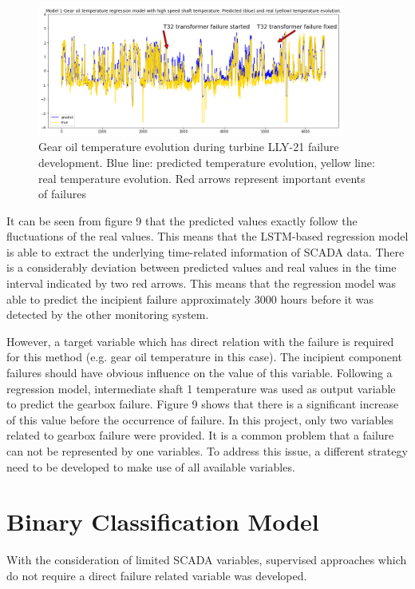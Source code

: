 \begin{figure}[]
\centering
\includegraphics[width=0.9\textwidth]{figures/regression.png}
\caption{Gear oil temperature evolution during turbine LLY-21 failure development. Blue line: predicted temperature evolution, yellow line: real temperature evolution. Red arrows represent important events of failures}
\label{fig:B-B1}
\end{figure}

It can be seen from figure 9 that the predicted values exactly follow the fluctuations of the real values. This means that the LSTM-based regression model is able to extract the underlying time-related information of SCADA data. There is a considerably deviation between predicted values and real values in the time interval indicated by two red arrows. This means that the regression model was able to predict the incipient failure approximately 3000 hours before it was detected by the other monitoring system.

However, a target variable which has direct relation with the failure is required for this method (e.g. gear oil temperature in this case). The incipient component failures should have obvious influence on the value of this variable. Following a regression model\cite{Sofia}, intermediate shaft 1 temperature was used as output variable to predict the gearbox failure. Figure 9 shows that there is a significant increase of this value before the occurrence of failure. In this project, only two variables related to gearbox failure were provided. It is a common problem that a failure can not be represented by one variables. To address this issue, a different strategy need to be developed to make use of all available variables.


\section{Binary Classification Model}
With the consideration of limited SCADA variables, supervised approaches which do not require a direct failure related variable was developed. 

